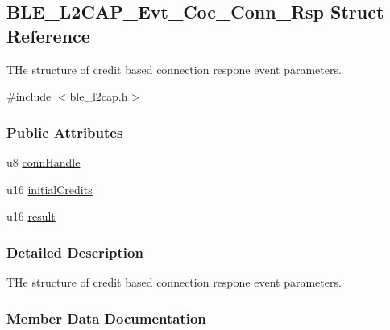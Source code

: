 \hypertarget{struct_b_l_e___l2_c_a_p___evt___coc___conn___rsp}{}\subsection{B\+L\+E\+\_\+\+L2\+C\+A\+P\+\_\+\+Evt\+\_\+\+Coc\+\_\+\+Conn\+\_\+\+Rsp Struct Reference}
\label{struct_b_l_e___l2_c_a_p___evt___coc___conn___rsp}


T\+He structure of credit based connection respone event parameters.  




{\ttfamily \#include $<$ble\+\_\+l2cap.\+h$>$}

\subsubsection*{Public Attributes}
\begin{DoxyCompactItemize}
\item 
u8 \hyperlink{struct_b_l_e___l2_c_a_p___evt___coc___conn___rsp_aae244a60ba71fe2446da819ebd479d5b}{conn\+Handle}
\item 
u16 \hyperlink{struct_b_l_e___l2_c_a_p___evt___coc___conn___rsp_ac918cb6104e814084150fc2fc25eac3d}{initial\+Credits}
\item 
u16 \hyperlink{struct_b_l_e___l2_c_a_p___evt___coc___conn___rsp_a93ec63cf450db31ed2f2de786bc7d4d2}{result}
\end{DoxyCompactItemize}


\subsubsection{Detailed Description}
T\+He structure of credit based connection respone event parameters. 

\subsubsection{Member Data Documentation}
